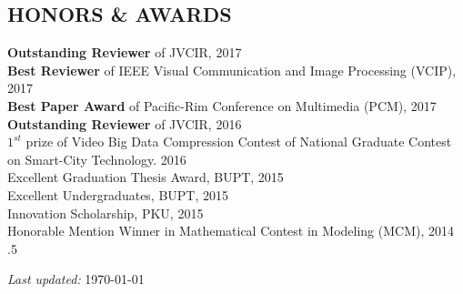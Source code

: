\documentclass[margin, 10pt]{res} %
\begin{document}
\begin{resume}

\section{HONORS \& AWARDS}
{\bf Outstanding Reviewer} of JVCIR, \hfill 2017 \\
{\bf Best Reviewer} of IEEE Visual Communication and Image Processing (VCIP), \hfill 2017 \\
{\bf Best Paper Award} of Pacific-Rim Conference on Multimedia (PCM), \hfill 2017 \\
{\bf Outstanding Reviewer} of JVCIR, \hfill 2016 \\
{\bf ${1}^{st}$} prize of Video Big Data Compression Contest of National Graduate Contest on Smart-City Technology. \hfill 2016 \\
Excellent Graduation Thesis Award, BUPT, \hfill 2015 \\
Excellent Undergraduates, BUPT, \hfill 2015 \\
Innovation Scholarship, PKU, \hfill 2015 \\
Honorable Mention Winner in Mathematical Contest in Modeling (MCM), \hfill 2014 \\


\moveleft.5\hoffset\centerline{
\textit{Last updated:}
\today
}

\end{resume}
\end{document}
